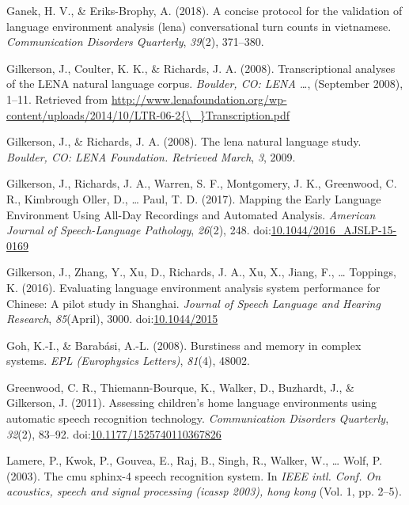 \documentclass[english,table,man,floatsintext]{apa6}
\begin{document}
\leavevmode\hypertarget{ref-ganek2018concise}{}%
Ganek, H. V., \& Eriks-Brophy, A. (2018). A concise protocol for the validation of language environment analysis (lena) conversational turn counts in vietnamese. \emph{Communication Disorders Quarterly}, \emph{39}(2), 371--380.

\leavevmode\hypertarget{ref-Gilkerson2008ltr6}{}%
Gilkerson, J., Coulter, K. K., \& Richards, J. A. (2008). Transcriptional analyses of the LENA natural language corpus. \emph{Boulder, CO: LENA \ldots{}}, (September 2008), 1--11. Retrieved from \href{http://www.lenafoundation.org/wp-content/uploads/2014/10/LTR-06-2\%7B/_\%7DTranscription.pdf}{http://www.lenafoundation.org/wp-content/uploads/2014/10/LTR-06-2\{\textbackslash{}\_\}Transcription.pdf}

\leavevmode\hypertarget{ref-gilkerson2008lena}{}%
Gilkerson, J., \& Richards, J. A. (2008). The lena natural language study. \emph{Boulder, CO: LENA Foundation. Retrieved March}, \emph{3}, 2009.

\leavevmode\hypertarget{ref-Gilkerson2017}{}%
Gilkerson, J., Richards, J. A., Warren, S. F., Montgomery, J. K., Greenwood, C. R., Kimbrough Oller, D., \ldots{} Paul, T. D. (2017). Mapping the Early Language Environment Using All-Day Recordings and Automated Analysis. \emph{American Journal of Speech-Language Pathology}, \emph{26}(2), 248. doi:\href{https://doi.org/10.1044/2016_AJSLP-15-0169}{10.1044/2016\_AJSLP-15-0169}

\leavevmode\hypertarget{ref-Gilkerson2016}{}%
Gilkerson, J., Zhang, Y., Xu, D., Richards, J. A., Xu, X., Jiang, F., \ldots{} Toppings, K. (2016). Evaluating language environment analysis system performance for Chinese: A pilot study in Shanghai. \emph{Journal of Speech Language and Hearing Research}, \emph{85}(April), 3000. doi:\href{https://doi.org/10.1044/2015}{10.1044/2015}

\leavevmode\hypertarget{ref-goh2008burstiness}{}%
Goh, K.-I., \& Barabási, A.-L. (2008). Burstiness and memory in complex systems. \emph{EPL (Europhysics Letters)}, \emph{81}(4), 48002.

\leavevmode\hypertarget{ref-Greenwood2011}{}%
Greenwood, C. R., Thiemann-Bourque, K., Walker, D., Buzhardt, J., \& Gilkerson, J. (2011). Assessing children's home language environments using automatic speech recognition technology. \emph{Communication Disorders Quarterly}, \emph{32}(2), 83--92. doi:\href{https://doi.org/10.1177/1525740110367826}{10.1177/1525740110367826}

\leavevmode\hypertarget{ref-lamere2003cmu}{}%
Lamere, P., Kwok, P., Gouvea, E., Raj, B., Singh, R., Walker, W., \ldots{} Wolf, P. (2003). The cmu sphinx-4 speech recognition system. In \emph{IEEE intl. Conf. On acoustics, speech and signal processing (icassp 2003), hong kong} (Vol. 1, pp. 2--5).
\end{document}
